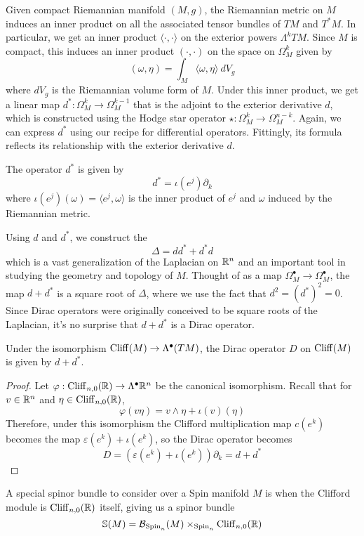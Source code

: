 Given compact Riemannian manifold $(M,g)$, the Riemannian metric on $M$ induces an
inner product on all the associated tensor bundles of $TM$ and $T^*M$. In
particular, we get an inner product $\langle \cdot,\cdot \rangle $ on the exterior
powers $\Lambda^kTM$. Since $M$ is compact, this induces an inner product
$(\cdot, \cdot)$ on the space on $\Omega_M^k$ given by
\[
(\omega,\eta) = \int_M \langle \omega, \eta \rangle~dV_g
\]
where $dV_g$ is the Riemannian volume form of $M$. Under this inner product,
we get a linear map $d^* : \Omega^k_M \to \Omega^{k-1}_M$ that is the adjoint to the
exterior derivative $d$, which is constructed using the Hodge star operator
$\star : \Omega^k_M \to \Omega_M^{n-k}$. Again, we can express $d^*$ using our
recipe for differential operators. Fittingly, its formula reflects its relationship
with the exterior derivative $d$.
%
\begin{prop}
The operator $d^*$ is given by
\[
d^* = \iota(e^j)\partial_k
\]
where $\iota(e^j)(\omega) = \langle e^j, \omega \rangle$ is the inner product of
$e^j$ and $\omega$ induced by the Riemannian metric.
\end{prop}
%
Using $d$ and $d^*$, we construct the 
\[
\Delta = dd^* + d^*d
\]
which is a vast generalization of the Laplacian on $\mathbb{R}^n$ and an important tool in
studying the geometry and topology of $M$. Thought of as a
map $\Omega^\bullet_M \to \Omega_M^\bullet$, the map $d + d^*$ is a square root
of $\Delta$, where we use the fact that $d^2 = (d^*)^2 = 0$. Since Dirac operators
were originally conceived to be square roots of the Laplacian, it's no surprise
that $d + d^*$ is a Dirac operator.
%
\begin{thm}
Under the isomorphism $\operatorname{Cliff}(M) \to \Lambda^\bullet(TM)$, the Dirac operator $D$
on $\operatorname{Cliff}(M)$ is given by $d + d^*$.
\end{thm}
%
\begin{proof}
Let $\varphi : \operatorname{Cliff}_{n,0}(\mathbb{R}) \to \Lambda^\bullet \mathbb{R}^n$ be the canonical isomorphism.
Recall that for $v \in \mathbb{R}^n$ and $\eta \in \operatorname{Cliff}_{n,0}(\mathbb{R})$,
\[
\varphi(v\eta) = v \wedge \eta + \iota(v)(\eta)
\]
Therefore, under this isomorphism the Clifford multiplication map $c(e^k)$ becomes
the map $\varepsilon(e^k) + \iota(e^k)$, so the Dirac operator becomes
\[
D = (\varepsilon(e^k) + \iota(e^k))\partial_k = d + d^*
\]
\end{proof}
%
A special spinor bundle to consider over a Spin manifold $M$ is when the Clifford
module is $\operatorname{Cliff}_{n,0}(\mathbb{R})$ itself, giving us a spinor bundle
\[
\mathbb{S}(M) = \mathcal{B}_{\mathrm{Spin}_n}(M) \times_{\mathrm{Spin}_n} \operatorname{Cliff}_{n,0}(\mathbb{R})
\]
